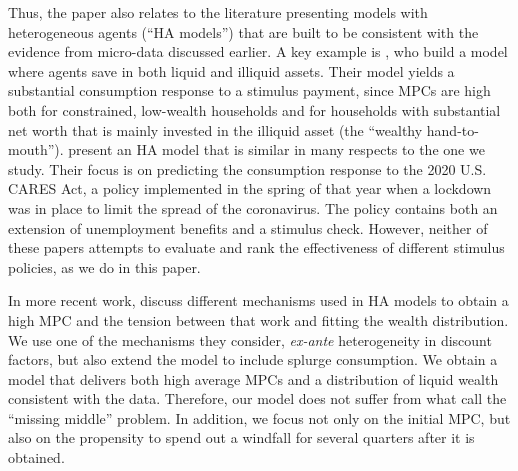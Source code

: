 \documentclass[\econtexRoot/HAFiscal]{subfiles}
\begin{document}
Thus, the paper also relates to the literature presenting models with heterogeneous agents (``HA models'') that are built to be consistent with the evidence from micro-data discussed earlier. A key example is \cite{kaplan2014model}, who build a model where agents save in both liquid and illiquid assets. Their model yields a substantial consumption response to a stimulus payment, since MPCs are high both for constrained, low-wealth households and for households with substantial net worth that is mainly invested in the illiquid asset (the ``wealthy hand-to-mouth''). \cite{carroll2020modeling} present an HA model that is similar in many respects to the one we study. Their focus is on predicting the consumption response to the 2020 U.S. CARES Act, a policy implemented in the spring of that year when a lockdown was in place to limit the spread of the coronavirus. The policy contains both an extension of unemployment benefits and a stimulus check. However, neither of these papers attempts to evaluate and rank the effectiveness of different stimulus policies, as we do in this paper. 

In more recent work, \cite{kaplanMPC2022} discuss different mechanisms used in HA models to obtain a high MPC and the tension between that work and fitting the wealth distribution. We use one of the mechanisms they consider, \textit{ex-ante} heterogeneity in discount factors, but also extend the model to include splurge consumption. We obtain a model that delivers both high average MPCs and a distribution of liquid wealth consistent with the data. Therefore, our model does not suffer from what \cite{kaplanMPC2022} call the ``missing middle'' problem. In addition, we focus not only on the initial MPC, but also on the propensity to spend out a windfall for several quarters after it is obtained. 
\end{document}
